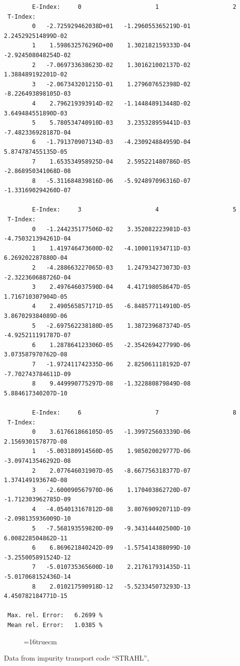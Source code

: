 \documentclass[12pt,dvips]{article}
\begin{document}
\begin{small}\begin{verbatim}
        E-Index:     0                     1                     2
 T-Index:
        0   -2.725929462038D+01   -1.296055365219D-01    2.245292514899D-02
        1    1.598632576296D+00    1.302182159333D-04   -2.924508048254D-02
        2   -7.069733638623D-02    1.301621002137D-02    1.388489192201D-02
        3   -2.067343201215D-01    1.279607652398D-02   -8.226493898105D-03
        4    2.796219393914D-02   -1.144848913448D-02    3.649484551890D-03
        5    5.780534740910D-03    3.235328959441D-03   -7.482336928187D-04
        6   -1.791370907134D-03   -4.230924884959D-04    5.874787455135D-05
        7    1.653534958925D-04    2.595221480786D-05   -2.868950341068D-08
        8   -5.311684839816D-06   -5.924897096316D-07   -1.331690294260D-07

        E-Index:     3                     4                     5
 T-Index:
        0   -1.244235177506D-02    3.352082223981D-03   -4.750321394261D-04
        1    1.419746473600D-02   -4.100011934711D-03    6.269202287880D-04
        2   -4.288663227065D-03    1.247934273073D-03   -2.322360688726D-04
        3    2.497646037590D-04    4.417198058647D-05    1.716710307904D-05
        4    2.490565857171D-05   -6.848577114910D-05    3.867029384089D-06
        5   -2.697562238180D-05    1.387239687374D-05   -4.925211191787D-07
        6    1.287864123306D-05   -2.354269427799D-06    3.073587970762D-08
        7   -1.972411742335D-06    2.825061118192D-07   -7.702743784611D-09
        8    9.449990775297D-08   -1.322880879849D-08    5.884617340207D-10

        E-Index:     6                     7                     8
 T-Index:
        0    3.617661866105D-05   -1.399725603339D-06    2.156930157877D-08
        1   -5.003180914560D-05    1.985020029777D-06   -3.097413546292D-08
        2    2.077646031907D-05   -8.667756318377D-07    1.374149193674D-08
        3   -2.600090567970D-06    1.170403862720D-07   -1.712303962785D-09
        4   -4.054013167812D-08    3.807690920711D-09   -2.098135936009D-10
        5   -7.568193559820D-09   -9.343144402500D-10    6.008228504862D-11
        6    6.869621840242D-09   -1.575414388099D-10   -3.255005891524D-12
        7   -5.010735365600D-10    2.217617931435D-11   -5.017068152436D-14
        8    2.010217590918D-12   -5.523345073293D-13    4.450782184771D-15

 Max. rel. Error:   6.2699 %
 Mean rel. Error:   1.0385 %

\end{verbatim}\end{small}
\begin{figure} \label{2.3.4B0}
\epsfxsize=16truecm
\end{figure}
\newpage
Data from impurity transport code ``STRAHL'', \cite{kn:Behringer}
\end{document}
